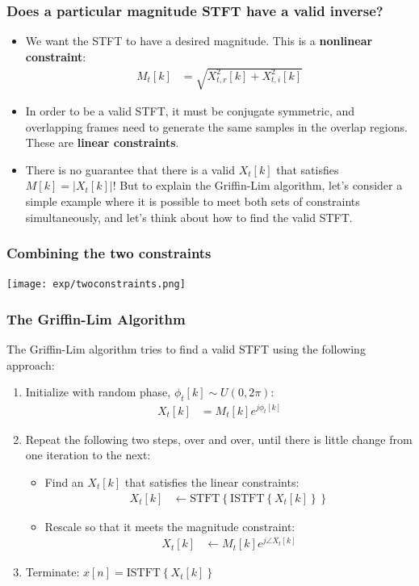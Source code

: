 \documentclass{beamer}
\begin{document}
\begin{frame}
  \frametitle{Does a particular magnitude STFT have a valid inverse?}

  \begin{itemize}
  \item We want the STFT to have a desired magnitude.  This is a {\bf
    nonlinear constraint}:
    \begin{align*}
      M_t[k] &= \sqrt{X_{t,r}^2[k]+X_{t,i}^2[k]}
    \end{align*}
  \item In order to be a valid STFT, it must be conjugate symmetric,
    and overlapping frames need to generate the same samples in the
    overlap regions.  These are {\bf linear constraints}.
  \item There is no guarantee that there is a valid $X_t[k]$ that
    satisfies $M[k]=|X_t[k]|$!  But to explain the Griffin-Lim
    algorithm, let's consider a simple example where it is possible to
    meet both sets of constraints simultaneously, and let's think
    about how to find the valid STFT.
  \end{itemize}
\end{frame}

\begin{frame}
  \frametitle{Combining the two constraints}
  \centerline{\texttt{[image: exp/twoconstraints.png]}}  
\end{frame}

\begin{frame}
  \frametitle{The Griffin-Lim Algorithm}

  The Griffin-Lim algorithm tries to find a valid STFT using the
  following approach:
  \begin{enumerate}
  \item Initialize with random phase, $\phi_t[k]\sim U(0,2\pi)$:
    \begin{align*}
      X_t[k] &= M_t[k]e^{j\phi_t[k]}
    \end{align*}
  \item Repeat the following two steps, over and over, until there is
    little change from one iteration to the next:
    \begin{itemize}
    \item Find an $X_t[k]$ that satisfies the linear constraints:
      \begin{align*}
        X_t[k] &\leftarrow \text{STFT}\left\{\text{ISTFT}\left\{X_t[k]\right\}\right\}
      \end{align*}
    \item Rescale so that it meets the magnitude constraint:
      \begin{align*}
        X_t[k] &\leftarrow M_t[k]e^{j\angle X_t[k]}
      \end{align*}
    \end{itemize}
    \item Terminate: $x[n]=\text{ISTFT}\left\{X_t[k]\right\}$
  \end{enumerate}
\end{frame}
\end{document}
